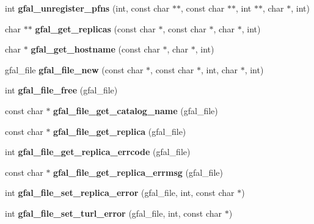 \begin{CompactItemize}
\item 
int \textbf{gfal\_\-unregister\_\-pfns} (int, const char $\ast$$\ast$, const char $\ast$$\ast$, int $\ast$$\ast$, char $\ast$, int)\label{group__internal__group_g70f889fa2436723fb7b3cff20b661f21}

\item 
char $\ast$$\ast$ \textbf{gfal\_\-get\_\-replicas} (const char $\ast$, const char $\ast$, char $\ast$, int)\label{group__internal__group_gbd0a581309f65e07a5e28d442f07b169}

\item 
char $\ast$ \textbf{gfal\_\-get\_\-hostname} (const char $\ast$, char $\ast$, int)\label{group__internal__group_gfbe1d2da151f9bd6a0ab1ec1abf0ac81}

\item 
gfal\_\-file \textbf{gfal\_\-file\_\-new} (const char $\ast$, const char $\ast$, int, char $\ast$, int)\label{group__internal__group_g4c083c77e3b95b63f7a66d9cad7d24b4}

\item 
int \textbf{gfal\_\-file\_\-free} (gfal\_\-file)\label{group__internal__group_g564d0244067d6e1d424cea5ec1336be6}

\item 
const char $\ast$ \textbf{gfal\_\-file\_\-get\_\-catalog\_\-name} (gfal\_\-file)\label{group__internal__group_g8e5135cef19dfa4106dc8a6da1b78721}

\item 
const char $\ast$ \textbf{gfal\_\-file\_\-get\_\-replica} (gfal\_\-file)\label{group__internal__group_ga3feb45524d1a8e8cccd33249ee3ccb7}

\item 
int \textbf{gfal\_\-file\_\-get\_\-replica\_\-errcode} (gfal\_\-file)\label{group__internal__group_g19b575e12fff918eda15bf9933705f9a}

\item 
const char $\ast$ \textbf{gfal\_\-file\_\-get\_\-replica\_\-errmsg} (gfal\_\-file)\label{group__internal__group_ga8418371e63e1c3ee5da57b0b75a0a32}

\item 
int \textbf{gfal\_\-file\_\-set\_\-replica\_\-error} (gfal\_\-file, int, const char $\ast$)\label{group__internal__group_g5de1931dff2c84de9db70f88cfe85662}

\item 
int \textbf{gfal\_\-file\_\-set\_\-turl\_\-error} (gfal\_\-file, int, const char $\ast$)\label{group__internal__group_gafd5eb622406793e29b3aaf4d82ca399}


\end{CompactItemize}
